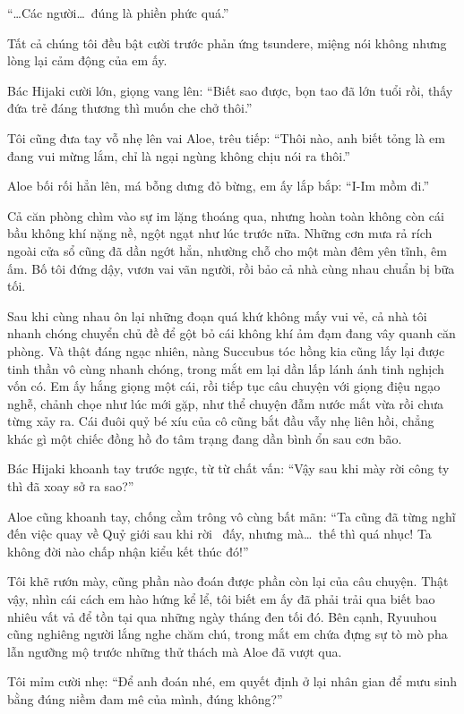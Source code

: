 \documentclass[../main.tex]{subfiles}
\begin{document}
``\dots Các người\dots\ đúng là phiền phức quá.''

Tất cả chúng tôi đều bật cười trước phản ứng tsundere, miệng nói không nhưng lòng lại cảm động của em ấy.

Bác Hijaki cười lớn, giọng vang lên: ``Biết sao được, bọn tao đã lớn tuổi rồi, thấy đứa trẻ đáng thương thì muốn che chở thôi.''

Tôi cũng đưa tay vỗ nhẹ lên vai Aloe, trêu tiếp: ``Thôi nào, anh biết tỏng là em đang vui mừng lắm, chỉ là ngại ngùng không chịu nói ra thôi.''

Aloe bối rối hẳn lên, má bỗng dưng đỏ bừng, em ấy lắp bắp: ``I-Im mồm đi.''

Cả căn phòng chìm vào sự im lặng thoáng qua, nhưng hoàn toàn không còn cái bầu không khí nặng nề, ngột ngạt như lúc trước nữa. Những cơn mưa rả rích ngoài cửa sổ cũng đã dần ngớt hẳn, nhường chỗ cho một màn đêm yên tĩnh, êm ấm. Bố tôi đứng dậy, vươn vai vãn người, rồi bảo cả nhà cùng nhau chuẩn bị bữa tối.

\ct

Sau khi cùng nhau ôn lại những đoạn quá khứ không mấy vui vẻ, cả nhà tôi nhanh chóng chuyển chủ đề để gột bỏ cái không khí ảm đạm đang vây quanh căn phòng. Và thật đáng ngạc nhiên, nàng Succubus tóc hồng kia cũng lấy lại được tinh thần vô cùng nhanh chóng, trong mắt em lại dần lấp lánh ánh tinh nghịch vốn có. Em ấy hắng giọng một cái, rồi tiếp tục câu chuyện với giọng điệu ngạo nghễ, chảnh chọe như lúc mới gặp, như thể chuyện đẫm nước mắt vừa rồi chưa từng xảy ra. Cái đuôi quỷ bé xíu của cô cũng bắt đầu vẫy nhẹ liên hồi, chẳng khác gì một chiếc đồng hồ đo tâm trạng đang dần bình ổn sau cơn bão.

Bác Hijaki khoanh tay trước ngực, từ từ chất vấn: ``Vậy sau khi mày rời công ty thì đã xoay sở ra sao?''

Aloe cũng khoanh tay, chống cằm trông vô cùng bất mãn: ``Ta cũng đã từng nghĩ đến việc quay về Quỷ giới sau khi rời \hll\ đấy, nhưng mà\dots\ thế thì quá nhục! Ta không đời nào chấp nhận kiểu kết thúc đó!''

Tôi khẽ rướn mày, cũng phần nào đoán được phần còn lại của câu chuyện. Thật vậy, nhìn cái cách em hào hứng kể lể, tôi biết em ấy đã phải trải qua biết bao nhiêu vất vả để tồn tại qua những ngày tháng đen tối đó. Bên cạnh, Ryuuhou cũng nghiêng người lắng nghe chăm chú, trong mắt em chứa đựng sự tò mò pha lẫn ngưỡng mộ trước những thử thách mà Aloe đã vượt qua.

Tôi mỉm cười nhẹ: ``Để anh đoán nhé, em quyết định ở lại nhân gian để mưu sinh bằng đúng niềm đam mê của mình, đúng không?''
\end{document}
